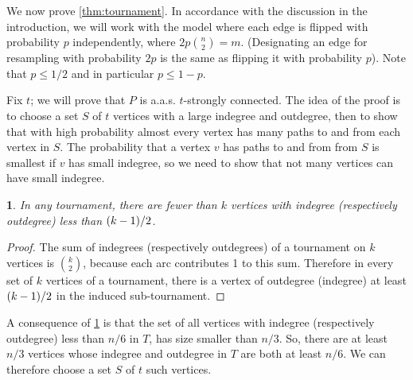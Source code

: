 \documentclass[11pt,english]{article}
\theoremstyle{plain}
\theoremstyle{definition}
\theoremstyle{definition}
\theoremstyle{plain}
\theoremstyle{plain}
\theoremstyle{plain}
\newtheorem{lem}[thm]{\protect\lemmaname}
\theoremstyle{plain}
\theoremstyle{remark}
\theoremstyle{remark}
\let\originalleft\left
\let\originalright\right
\renewcommand{\left}{\mathopen{}\mathclose\bgroup\originalleft}
\renewcommand{\right}{\aftergroup\egroup\originalright}
\providecommand{\lemmaname}{Lemma}
\begin{document}
We now prove \ref{thm:tournament}. In accordance with the discussion
in the introduction, we will work with the model where each edge is
flipped with probability $p$ independently, where $2p{n \choose 2}=m$.
(Designating an edge for resampling with probability $2p$ is the
same as flipping it with probability $p$). Note that $p\le1/2$ and in particular $p\le1-p$.

Fix $t$; we will prove that $P$ is a.a.s. $t$-strongly connected. The
idea of the proof is to choose a set $S$ of $t$ vertices with a
large indegree and outdegree, then to show that with high probability
almost every vertex has many paths to and from each vertex in $S$.
The probability that a vertex $v$ has paths to and from from $S$ is smallest
if $v$ has small indegree, so we need to show that not many vertices
can have small indegree.
\begin{lem}
\label{lem:extreme-indegree-bound}In any tournament, there are fewer
than $k$ vertices with indegree (respectively outdegree) less than
$\left(k-1\right)/2$.\end{lem}
\begin{proof}
The sum of indegrees (respectively outdegrees) of a tournament on
$k$ vertices is ${k \choose 2}$, because each arc contributes 1
to this sum. Therefore in every set of $k$ vertices of a tournament,
there is a vertex of outdegree (indegree) at least $\left(k-1\right)/2$
in the induced sub-tournament.
\end{proof}
A consequence of \ref{lem:extreme-indegree-bound} is that the set
of all vertices with indegree (respectively outdegree) less than $n/6$
in $T$, has size smaller than $n/3$. So, there are at least $n/3$ vertices
whose indegree and outdegree in $T$ are both at least $n/6$. We can therefore choose
a set $S$ of $t$ such vertices.
\end{document}

